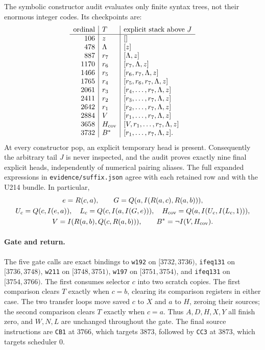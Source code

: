 The symbolic constructor audit evaluates only finite syntax trees, not
their enormous integer codes.  Its checkpoints are:
\[
 \begin{array}{r|l|l}
 \text{ordinal}&T&\text{explicit stack above }J\\\hline
 106&z&[]\\
 478&\Lambda&[z]\\
 887&r_7&[\Lambda,z]\\
 1170&r_6&[r_7,\Lambda,z]\\
 1466&r_5&[r_6,r_7,\Lambda,z]\\
 1765&r_4&[r_5,r_6,r_7,\Lambda,z]\\
 2061&r_3&[r_4,\ldots,r_7,\Lambda,z]\\
 2411&r_2&[r_3,\ldots,r_7,\Lambda,z]\\
 2642&r_1&[r_2,\ldots,r_7,\Lambda,z]\\
 2884&V&[r_1,\ldots,r_7,\Lambda,z]\\
 3658&H_{\rm cov}&[V,r_1,\ldots,r_7,\Lambda,z]\\
 3732&B^*&[r_1,\ldots,r_7,\Lambda,z].
 \end{array}
\]
At every constructor pop, an explicit temporary head is present.
Consequently the arbitrary tail $J$ is never inspected, and the audit
proves exactly nine final explicit heads, independently of numerical
pairing aliases.  The full expanded expressions in
\texttt{evidence/suffix.json} agree with each retained row and with the
U214 bundle.  In particular,
\[
 \begin{gathered}
 e=R(c,a),\qquad G=Q(a,I(R(a,c),R(a,b))),\\
 U_c=Q(c,I(e,a)),\quad
 L_c=Q(c,I(a,I(G,e))),\quad
 H_{\rm cov}=Q(a,I(U_c,I(L_c,1))),\\
 V=I(R(a,b),Q(c,R(a,b))),\qquad
 B^*=\neg I(V,H_{\rm cov}).
 \end{gathered}
\]

\paragraph{Gate and return.}
The five gate calls are exact bindings to
\texttt{w192} on $[3732,3736)$,
\texttt{ifeq131} on $[3736,3748)$,
\texttt{w211} on $[3748,3751)$,
\texttt{w197} on $[3751,3754)$, and
\texttt{ifeq131} on $[3754,3766)$.
The first consumes selector $c$ into two scratch copies.  The first
comparison clears $T$ exactly when $c=b$, clearing its comparison
registers in either case.  The two transfer loops move saved $c$ to
$X$ and $a$ to $H$, zeroing their sources; the second comparison clears
$T$ exactly when $c=a$.  Thus $A,D,H,X,Y$ all finish zero, and $W,N,L$
are unchanged throughout the gate.  The final source instructions are
\texttt{CB1} at $3766$, which targets $3873$, followed by
\texttt{CC3} at $3873$, which targets scheduler $0$.

